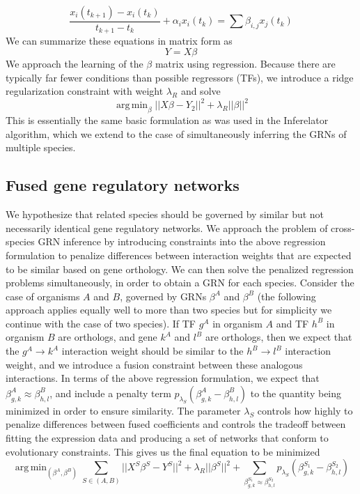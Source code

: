 \documentclass[11pt]{article}
\DeclareMathOperator*{\argmin}{arg\,min}
\begin{document}
\begin{equation}
\frac{x_i(t_{k+1})-x_i(t_k)}{t_{k+1}-t_k} + \alpha_{i}x_{i}(t_k)= \sum \beta_{i,j}x_{j}(t_k)
\end{equation}
\noindent We can summarize these equations in matrix form as
\begin{equation}
Y = X \beta 
\end{equation}
\noindent We approach the learning of the $\beta$ matrix using regression. Because there are typically far fewer conditions than possible regressors (TFs), we introduce a ridge regularization constraint with weight $\lambda_R$ and solve
\begin{equation}
\argmin_\beta\vert \vert X\beta - Y_2 \vert \vert ^2 + \lambda_R \vert \vert \beta \vert \vert ^2
\end{equation}
This is essentially the same basic formulation as was used in the Inferelator algorithm, which we extend to the case of simultaneously inferring the GRNs of multiple species. 

\subsection{Fused gene regulatory networks}
We hypothesize that related species should be governed by similar but not necessarily identical gene regulatory networks. We approach the problem of cross-species GRN inference by introducing constraints into the above regression formulation to penalize differences between interaction weights that are expected to be similar based on gene orthology. We can then solve the penalized regression problems simultaneously, in order to obtain a GRN for each species. Consider the case of organisms $A$ and $B$, governed by GRNs $\beta^A$ and $\beta^B$ (the following approach applies equally well to more than two species but for simplicity we continue with the case of two species). If TF $g^A$ in organism $A$ and TF $h^B$ in organism $B$ are orthologs, and gene $k^A$ and $l^B$ are orthologs, then we expect that the $g^A \rightarrow k^A$ interaction weight should be similar to the $h^B \rightarrow l^B$ interaction weight, and we introduce a fusion constraint between these analogous interactions. In terms of the above regression formulation, we expect that $\beta^A_{g,k} \approx \beta^B_{h,l}$, and include a penalty term $p_{\lambda_S}(\beta^A_{g,k} - \beta^B_{h,l})$ to the quantity being minimized in order to ensure similarity. The parameter $\lambda_S$ controls how highly to penalize differences between fused coefficients and controls the tradeoff between fitting the expression data and producing a set of networks that conform to evolutionary constraints. This gives us the final equation to be minimized 
\begin{equation}
\argmin_{(\beta^A, \beta^B)} \displaystyle\sum_{S \in (A, B)} \vert \vert X^S\beta^S - Y^S \vert \vert ^2 + \lambda_R \vert \vert \beta^S \vert \vert ^2 + \displaystyle \sum_{\beta^{S_1}_{g,k} \approx \beta^{S_2}_{h,l}} p_{\lambda_S}(\beta^{S_1}_{g,k} - \beta^{S_2}_{h,l})
\end{equation}
\end{document}
